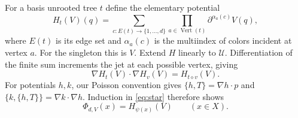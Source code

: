 \documentclass[11pt]{article}
\begin{document}
For a basis unrooted tree $t$ define the elementary potential
\begin{equation}\label{eq:contraction}
 H_t(V)(q)=\sum_{c:E(t)\to\{1,\ldots,d\}}
               \prod_{a\in\operatorname{Vert}(t)}
                      \partial^{\alpha_a(c)}V(q),
\end{equation}
where $E(t)$ is its edge set and $\alpha_a(c)$ is the multiindex of colors
incident at vertex $a$. For the singleton this is $V$. Extend $H$ linearly
to $\mathcal U$. Differentiation of the finite sum increments the jet at
each possible vertex, giving
\begin{equation}\label{eq:gradient}
 \nabla H_t(V)\cdot\nabla H_v(V)=H_{t\diamond v}(V).
\end{equation}
For potentials $h,k$, our Poisson convention gives
$\{h,T\}=\nabla h\cdot p$ and
$\{k,\{h,T\}\}=\nabla k\cdot\nabla h$.
Induction in \eqref{eq:star} therefore shows
\begin{equation}\label{eq:realization}
 \Phi_{d,V}(x)=H_{\psi(x)}(V)\qquad(x\in X).
\end{equation}
\end{document}
